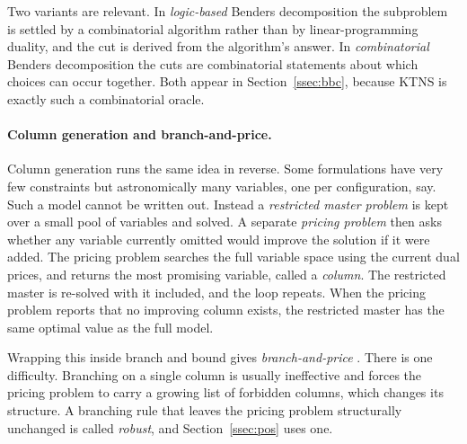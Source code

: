 Two variants are relevant. In \emph{logic-based} Benders decomposition
\citep{Hooker2003} the subproblem is settled by a combinatorial algorithm rather than
by linear-programming duality, and the cut is derived from the algorithm's answer. In
\emph{combinatorial} Benders decomposition \citep{Codato2006} the cuts are
combinatorial statements about which choices can occur together. Both appear in
Section~\ref{ssec:bbc}, because KTNS is exactly such a combinatorial oracle.

\paragraph{Column generation and branch-and-price.}
Column generation runs the same idea in reverse. Some formulations have very few
constraints but astronomically many variables, one per configuration, say. Such a
model cannot be written out. Instead a \emph{restricted master problem} is kept over
a small pool of variables and solved. A separate \emph{pricing problem} then asks
whether any variable currently omitted would improve the solution if it were added.
The pricing problem searches the full variable space using the current dual prices,
and returns the most promising variable, called a \emph{column}. The restricted
master is re-solved with it included, and the loop repeats. When the pricing problem
reports that no improving column exists, the restricted master has the same optimal
value as the full model.

Wrapping this inside branch and bound gives \emph{branch-and-price}
\citep{Barnhart1998,Lubbecke2005}. There is one difficulty. Branching on a single
column is usually ineffective and forces the pricing problem to carry a growing list
of forbidden columns, which changes its structure. A branching rule that leaves the
pricing problem structurally unchanged is called \emph{robust}, and
Section~\ref{ssec:pos} uses one.
